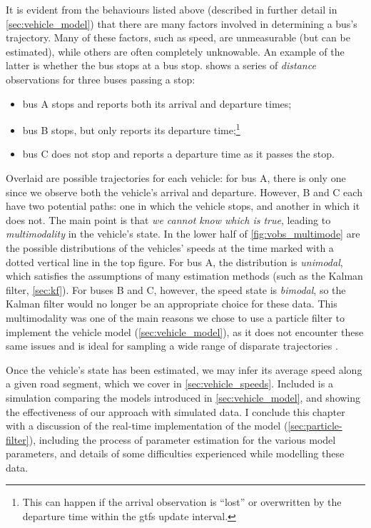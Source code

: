 It is evident from the behaviours listed above (described in further detail in \cref{sec:vehicle_model}) that there are many factors involved in determining a bus's trajectory. Many of these factors, such as speed, are unmeasurable (but can be estimated), while others are often completely unknowable. An example of the latter is whether the bus stops at a bus stop.  shows a series of \emph{distance} observations for three buses passing a stop:
\begin{itemize}
\item bus A stops and reports both its arrival and departure times;
\item bus B stops, but only reports its departure time;\footnote{This can happen if the arrival observation is ``lost'' or overwritten by the departure time within the \gls{gtfs} update interval.}
\item bus C does not stop and reports a departure time as it passes the stop.
\end{itemize}
Overlaid are possible trajectories for each vehicle: for bus A, there is only one since we observe both the vehicle's arrival and departure. However, B and C each have two potential paths: one in which the vehicle stops, and another in which it does not. The main point is that \emph{we cannot know which is true}, leading to \emph{multimodality} in the vehicle's state. In the lower half of \cref{fig:vobs_multimode} are the possible distributions of the vehicles' speeds at the time marked with a dotted vertical line in the top figure. For bus A, the distribution is \emph{unimodal}, which satisfies the assumptions of many estimation methods (such as the Kalman filter, \cref{sec:kf}). For buses B and C, however, the speed state is \emph{bimodal}, so the Kalman filter would no longer be an appropriate choice for these data. This multimodality was one of the main reasons we chose to use a particle filter to implement the vehicle model (\cref{sec:vehicle_model}), as it does not encounter these same issues and is ideal for sampling a wide range of disparate trajectories \citep{Hans_2015,Ulmke_2006}.

Once the vehicle's state has been estimated, we may infer its average speed along a given road segment, which we cover in \cref{sec:vehicle_speeds}. Included is a simulation comparing the models introduced in \cref{sec:vehicle_model}, and showing the effectiveness of our approach with simulated data. I conclude this chapter with a discussion of the real-time implementation of the model (\cref{sec:particle-filter}), including the process of parameter estimation for the various model parameters, and details of some difficulties experienced while modelling these data.



